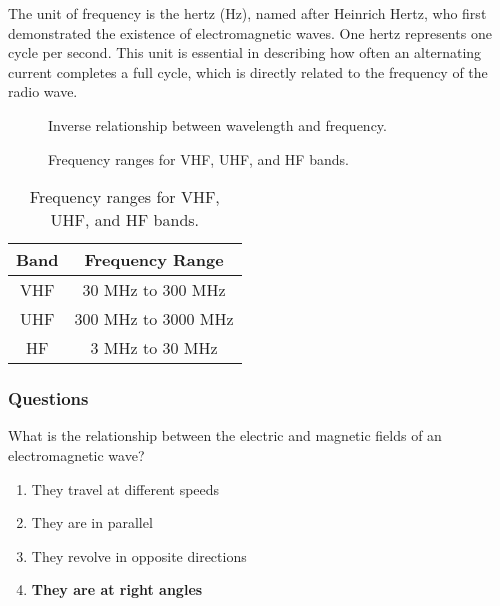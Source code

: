 The unit of frequency is the hertz (Hz), named after Heinrich Hertz, who first demonstrated the existence of electromagnetic waves. One hertz represents one cycle per second. This unit is essential in describing how often an alternating current completes a full cycle, which is directly related to the frequency of the radio wave.

\begin{figure}[h]
    \centering
    \caption{Inverse relationship between wavelength and frequency.}
    \label{fig:wavelength-frequency}
\end{figure}

\begin{figure}[h]
    \centering
    \caption{Frequency ranges for VHF, UHF, and HF bands.}
    \label{fig:frequency-bands}
\end{figure}

\begin{table}[h]
    \centering
    \begin{tabular}{|c|c|}
        \hline
        \textbf{Band} & \textbf{Frequency Range} \\
        \hline
        VHF & 30 MHz to 300 MHz \\
        UHF & 300 MHz to 3000 MHz \\
        HF & 3 MHz to 30 MHz \\
        \hline
    \end{tabular}
    \caption{Frequency ranges for VHF, UHF, and HF bands.}
    \label{tab:frequency-ranges}
\end{table}

\subsubsection*{Questions}

\begin{tcolorbox}[colback=gray!10!white,colframe=black!75!black,title={T3B01}]
What is the relationship between the electric and magnetic fields of an electromagnetic wave?
\begin{enumerate}[label=\Alph*),noitemsep]
    \item They travel at different speeds
    \item They are in parallel
    \item They revolve in opposite directions
    \item \textbf{They are at right angles}
\end{enumerate}
\end{tcolorbox}

